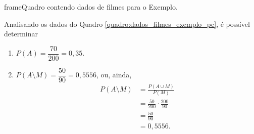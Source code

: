 \begin{pageWidthArea}
	\begin{pageWidthAreaPicture}{frame}{Quadro contendo dados de filmes para o Exemplo.}
		\label{quadro:dados_filmes_exemplo_pc}
		\hspace{-15pt}
	\end{pageWidthAreaPicture}
	
	\vspace{20pt}

	\begin{example}
		\begin{multicols}{2}
			Analisando os dados do Quadro \ref{quadro:dados_filmes_exemplo_pc}, é possível determinar\\
	
			\begin{enumerate}[label=\alph*), itemsep=10pt]
				\item $P(A)=\dfrac{70}{200}=0,35$.
		
				\item $P(A\setminus M)=\dfrac{50}{90}=0,5556$, ou, ainda,
				\begin{align*}
					P(A\setminus M)&=\frac{P(A\cup M)}{P(M)}\\
							&=\frac{50}{200}\cdot \frac{200}{90}\\
							&=\frac{50}{90}\\
							&=0,5556\text{.}
				\end{align*}
		

\end{enumerate}
\end{multicols}
\end{example}
\end{pageWidthArea}

